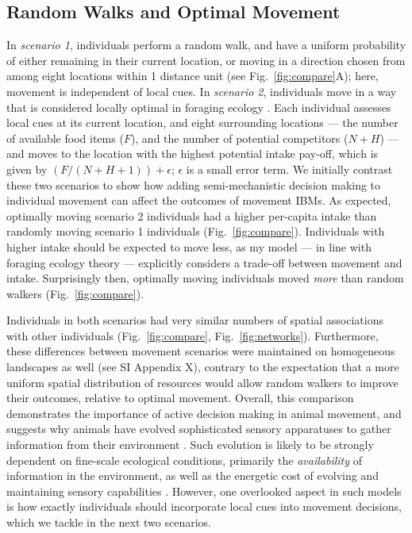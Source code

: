 \subsection*{Random Walks and Optimal Movement}

In \textit{scenario 1}, individuals perform a random walk, and have a uniform probability of either remaining in their current location, or moving in a direction chosen from among eight locations within 1 distance unit (see Fig.~\ref{fig:compare}A); here, movement is independent of local cues.
In \textit{scenario 2}, individuals move in a way that is considered locally optimal in foraging ecology \citep{stephens2019,scherer2020}.
Each individual assesses local cues at its current location, and eight surrounding locations --- the number of available food items ($F$), and the number of potential competitors ($N + H$) --- and moves to the location with the highest potential intake pay-off, which is given by $(F / (N + H + 1)) + \epsilon$; $\epsilon$ is a small error term.
We initially contrast these two scenarios to show how adding semi-mechanistic decision making to individual movement can affect the outcomes of movement IBMs.
As expected, optimally moving scenario 2 individuals had a higher per-capita intake than randomly moving scenario 1 individuals (Fig.~\ref{fig:compare}).
Individuals with higher intake should be expected to move less, as my model --- in line with foraging ecology theory \citep{charnov1976} --- explicitly considers a trade-off between movement and intake.
Surprisingly then, optimally moving individuals moved \textit{more} than random walkers (Fig.~\ref{fig:compare}).

Individuals in both scenarios had very similar numbers of spatial associations with other individuals (Fig.~\ref{fig:compare}, Fig.~\ref{fig:networks}).
Furthermore, these differences between movement scenarios were maintained on homogeneous landscapes as well (see SI Appendix X), contrary to the expectation that a more uniform spatial distribution of resources would allow random walkers to improve their outcomes, relative to optimal movement.
Overall, this comparison demonstrates the importance of active decision making in animal movement, and suggests why animals have evolved sophisticated sensory apparatuses to gather information from their environment \citep{avgar2013,berger2022,mann2021,swain2021}.
Such evolution is likely to be strongly dependent on fine-scale ecological conditions, primarily the \textit{availability} of information in the environment, as well as the energetic cost of evolving and maintaining sensory capabilities \citep{swain2021}.
However, one overlooked aspect in such models is how exactly individuals should incorporate local cues into movement decisions, which we tackle in the next two scenarios.

